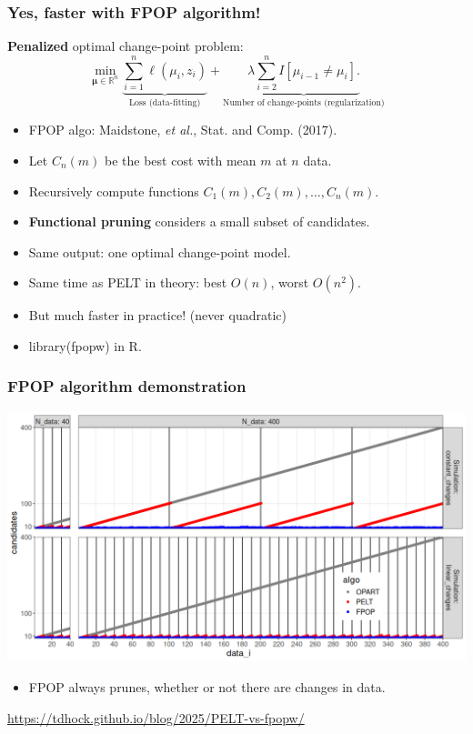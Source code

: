 \documentclass{beamer}
\newcommand{\RR}{\mathbb R}
\begin{document}
\begin{frame}
  \frametitle{Yes, faster with FPOP algorithm!}
  \textbf{Penalized} optimal change-point problem:
$$
\min_{
  \mathbf \mu\in\RR^{n}
}
\underbrace{\sum_{i=1}^{n} \ell( \mu_i,  z_i)}_{\text{Loss (data-fitting)}} + \underbrace{\lambda\sum_{i=2}^n I[\mu_{i-1}\neq \mu_i].}_{\text{Number of change-points (regularization)}}
$$
\begin{itemize}
\item FPOP algo: Maidstone, \emph{et al.}, Stat. and Comp. (2017).
\item Let $C_n(m)$ be the best cost with mean $m$ at $n$ data.
\item Recursively compute functions $C_{1}(m), C_2(m),\dots, C_{n}(m)$.
\item \textbf{Functional pruning} considers a small subset of candidates.
\item Same output: one optimal change-point model.
\item Same time as PELT in theory: best $O(n)$, worst $O(n^2)$.
\item But much faster in practice! (never quadratic)
\item library(fpopw) in R.
\end{itemize}
\end{frame}



\begin{frame}
  \frametitle{FPOP algorithm demonstration}
  \includegraphics[width=\textwidth]{fpop-prune-1.png}

  \begin{itemize}
  \item FPOP always prunes, whether or not there are changes in data.
  \end{itemize}

  \url{https://tdhock.github.io/blog/2025/PELT-vs-fpopw/}
\end{frame}
 
\end{document}
